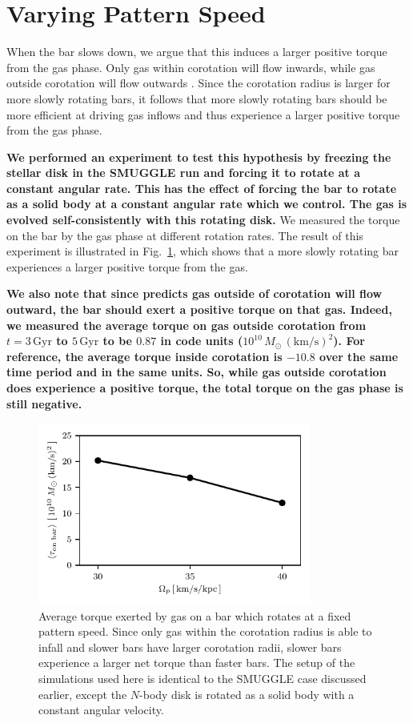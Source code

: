 \documentclass[twocolumn,linenumbers,trackchanges]{aastex631}
\newcommand{\Nbody}{$N$-body}
\newcommand{\SMUGGLE}{SMUGGLE}
\begin{document}
\section{Varying Pattern Speed}
\label{app:varyps}
When the bar slows down, we argue that this induces a larger positive torque
from the gas phase. Only gas within corotation will flow inwards, while gas
outside corotation will flow outwards \citep{2011MNRAS.415.1027H}. Since the
corotation radius is larger for more slowly rotating bars, it follows that
more slowly rotating bars should be more efficient at driving gas inflows and
thus experience a larger positive torque from the gas phase.

{\bf We performed an experiment to test this hypothesis by freezing the stellar
disk in the \SMUGGLE{} run and forcing it to rotate at a constant angular rate.
This has the effect of forcing the bar to rotate as a solid body at a constant
angular rate which we control. The gas is evolved self-consistently with this
rotating disk.} We measured the torque on the bar by the gas phase at different
rotation rates. The result of this experiment is illustrated in
Fig.~\ref{fig:equil}, which shows that a more slowly rotating bar experiences a
larger positive torque from the gas.

{\bf We also note that since \citet{2011MNRAS.415.1027H} predicts gas outside of
corotation will flow outward, the bar should exert a positive torque on that
gas. Indeed, we measured the average torque on gas outside corotation from
$t=3\,\textrm{Gyr}$ to $5\,\textrm{Gyr}$ to be $0.87$ in code units
($10^{10}\,M_{\odot}\,(\text{km}/\text{s})^2$). For reference, the average
torque inside corotation is $-10.8$ over the same time period and in the same
units. So, while gas outside corotation does experience a positive torque, the
total torque on the gas phase is still negative.}

\begin{figure}
    \centering
    \includegraphics[width=9cm]{fig/torque_ps.pdf}
    \caption{Average torque exerted by gas on a bar which rotates at a fixed
    pattern speed. Since only gas within the corotation radius is able to infall
    and slower bars have larger corotation radii, slower bars experience a
    larger net torque than faster bars. The setup of the simulations used here
    is identical to the \SMUGGLE{} case discussed earlier, except the \Nbody{} disk
    is rotated as a solid body with a constant angular
    velocity.}
    \label{fig:equil}
\end{figure}
\end{document}
